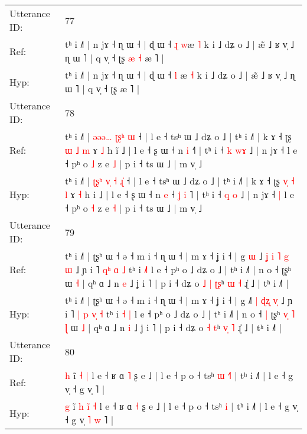 \documentclass[10pt]{article}
\DeclareRobustCommand{\hl}[1]{{\textcolor{red}{#1}}}
\begin{document}
\begin{longtable}{ll}
 \\
\midrule
Utterance ID: & 77 \\
Ref: & tʰ i ˩˥ | n jɤ ˧ ɳ ɯ ˧ | ɖ ɯ ˧ \hl{ɻ} \hl{w}æ \hl{˥} k i ˩ dʑ o ˩ | æ̃ ˩ ʁ v̩ ˩ ɳ ɯ ˥ | q v̩ ˧ ʈʂ\hl{ }\hl{æ}\hl{ }\hl{˧} æ ˥ |
 \\
Hyp: & tʰ i ˩˥ | n jɤ ˧ ɳ ɯ ˧ | ɖ ɯ ˧ \hl{l} \hl{}æ \hl{˧} k i ˩ dʑ o ˩ | æ̃ ˩ ʁ v̩ ˩ ɳ ɯ ˥ | q v̩ ˧ ʈʂ\hl{}\hl{}\hl{}\hl{} æ ˥ |
 \\
\midrule
Utterance ID: & 78 \\
Ref: & tʰ i ˩˥ | \hl{ə}\hl{ə}\hl{ə}\hl{…}\hl{ }\hl{ʈ}\hl{ʂ}\hl{ʰ} \hl{}\hl{ɯ} ˧ | l e ˧ tsʰ ɯ ˩ dʑ o ˩ | tʰ i ˩˥ | k ɤ ˧ ʈʂ \hl{}\hl{ɯ} \hl{˩} \hl{m} ɤ \hl{˩} h i\hl{̃} ˩ | l e ˧ ʂ ɯ ˧ n \hl{i} ˧\hl{}\hl{}\hl{}\hl{}\hl{}˥ | tʰ i ˧ \hl{k} \hl{w}\hl{ɤ} ˩ | n jɤ ˧\hl{}\hl{} l e ˧ pʰ o \hl{˩} z e \hl{˩} | p i ˧ ts ɯ ˩ | m v̩ ˩
 \\
Hyp: & tʰ i ˩˥ | \hl{ʈ}\hl{ʂ}\hl{ʰ}\hl{ }\hl{v}\hl{̩}\hl{ }\hl{˧} \hl{ɻ}\hl{̍} ˧ | l e ˧ tsʰ ɯ ˩ dʑ o ˩ | tʰ i ˩˥ | k ɤ ˧ ʈʂ \hl{v}\hl{̩} \hl{˧} \hl{l} ɤ \hl{˧} h i\hl{} ˩ | l e ˧ ʂ ɯ ˧ n \hl{e} ˧\hl{ }\hl{ʝ}\hl{ }\hl{i}\hl{ }˥ | tʰ i ˧ \hl{q} \hl{}\hl{o} ˩ | n jɤ ˧\hl{ }\hl{|} l e ˧ pʰ o \hl{˧} z e \hl{˧} | p i ˧ ts ɯ ˩ | m v̩ ˩
 \\
\midrule
Utterance ID: & 79 \\
Ref: & tʰ i ˩˥ | ʈʂʰ ɯ ˧ ə ˧ m i ˧ ɳ ɯ ˧ | m ɤ ˧ ʝ i ˧ | g\hl{ }\hl{ɯ} ˩\hl{ }\hl{ʝ} \hl{i} \hl{˥}\hl{ }\hl{g}\hl{ }\hl{ɯ} ˩ ɲ i ˥ \hl{}\hl{q}\hl{ʰ} \hl{}\hl{ɑ} \hl{˩} tʰ i \hl{}\hl{˩}\hl{˥} l e ˧ pʰ o ˩ dʑ o ˩ | tʰ i ˩˥ | n o ˧\hl{}\hl{} ʈʂʰ\hl{}\hl{}\hl{}\hl{}\hl{}\hl{}\hl{} ɯ \hl{˧} | qʰ ɑ ˩ n \hl{e} ˩ ʝ i ˥ | p i ˧ dʑ o\hl{ }\hl{˩} \hl{|} \hl{ʈ}\hl{ʂ}ʰ \hl{}\hl{ɯ} \hl{˧} ɻ̍ ˩ | tʰ i ˩˥ |
 \\
Hyp: & tʰ i ˩˥ | ʈʂʰ ɯ ˧ ə ˧ m i ˧ ɳ ɯ ˧ | m ɤ ˧ ʝ i ˧ | g\hl{}\hl{} ˩\hl{}\hl{˥} \hl{|} \hl{ɖ}\hl{ʐ}\hl{ }\hl{v}\hl{̩} ˩ ɲ i ˥ \hl{|}\hl{ }\hl{p} \hl{v}\hl{̩} \hl{˧} tʰ i \hl{˧}\hl{ }\hl{|} l e ˧ pʰ o ˩ dʑ o ˩ | tʰ i ˩˥ | n o ˧\hl{ }\hl{|} ʈʂʰ\hl{ }\hl{v}\hl{̩}\hl{ }\hl{˥}\hl{ }\hl{ɭ} ɯ \hl{˩} | qʰ ɑ ˩ n \hl{i} ˩ ʝ i ˥ | p i ˧ dʑ o\hl{}\hl{} \hl{˧} \hl{}\hl{t}ʰ \hl{v}\hl{̩} \hl{˥} ɻ̍ ˩ | tʰ i ˩˥ |
 \\
\midrule
Utterance ID: & 80 \\
Ref: & \hl{h} ĩ\hl{}\hl{} \hl{}\hl{˧} \hl{|} l e ˧ ʁ ɑ \hl{˥} ʂ e ˩ | l e ˧ p o ˧ tsʰ\hl{ }\hl{ɯ} \hl{˧}\hl{˥} | tʰ i ˩˥ | l e ˧ g v̩ ˧ g v̩\hl{}\hl{}\hl{}\hl{} ˥ |
 \\
Hyp: & \hl{g} ĩ\hl{ }\hl{h} \hl{i}\hl{̃} \hl{˧} l e ˧ ʁ ɑ \hl{˧} ʂ e ˩ | l e ˧ p o ˧ tsʰ\hl{}\hl{} \hl{}\hl{i} | tʰ i ˩˥ | l e ˧ g v̩ ˧ g v̩\hl{ }\hl{˥}\hl{ }\hl{w} ˥ |

\end{longtable}
\end{document}
